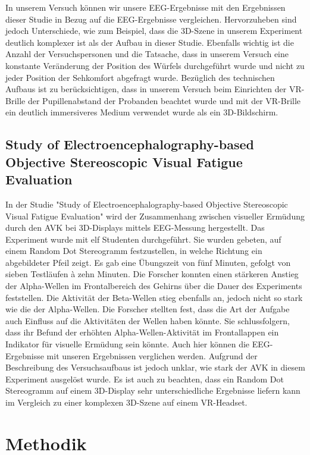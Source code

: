 \documentclass[conference]{IEEEtran}
\begin{document}
In unserem Versuch können wir unsere EEG-Ergebnisse mit den Ergebnissen dieser Studie in Bezug auf die EEG-Ergebnisse vergleichen. Hervorzuheben sind jedoch Unterschiede, wie zum Beispiel, dass die 3D-Szene in unserem Experiment deutlich komplexer ist als der Aufbau in dieser Studie. Ebenfalls wichtig ist die Anzahl der Versuchspersonen und die Tatsache, dass in unserem Versuch eine konstante Veränderung der Position des Würfels durchgeführt wurde und nicht zu jeder Position der Sehkomfort abgefragt wurde. Bezüglich des technischen Aufbaus ist zu berücksichtigen, dass in unserem Versuch beim Einrichten der VR-Brille der Pupillenabstand der Probanden beachtet wurde und mit der VR-Brille ein deutlich immersiveres Medium verwendet wurde als ein 3D-Bildschirm.


\subsection{Study of Electroencephalography-based Objective Stereoscopic Visual Fatigue Evaluation}
In der Studie "\textnormal{Study} of Electroencephalography-based Objective Stereoscopic Visual Fatigue Evaluation" \cite{b7} wird der Zusammenhang zwischen visueller Ermüdung durch den AVK bei 3D-Displays mittels EEG-Messung hergestellt.
Das Experiment wurde mit elf Studenten durchgeführt. Sie wurden gebeten, auf einem Random Dot Stereogramm festzustellen, in welche Richtung ein abgebildeter Pfeil zeigt. Es gab eine Übungszeit von fünf Minuten, gefolgt von sieben Testläufen à zehn Minuten.
Die Forscher konnten einen stärkeren Anstieg der Alpha-Wellen im Frontalbereich des Gehirns über die Dauer des Experiments feststellen. Die Aktivität der Beta-Wellen stieg ebenfalls an, jedoch nicht so stark wie die der Alpha-Wellen. Die Forscher stellten fest, dass die Art der Aufgabe auch Einfluss auf die Aktivitäten der Wellen haben könnte. Sie schlussfolgern, dass ihr Befund der erhöhten Alpha-Wellen-Aktivität im Frontallappen ein Indikator für visuelle Ermüdung sein könnte.
Auch hier können die EEG-Ergebnisse mit unseren Ergebnissen verglichen werden. Aufgrund der Beschreibung des Versuchsaufbaus ist jedoch unklar, wie stark der AVK in diesem Experiment ausgelöst wurde. Es ist auch zu beachten, dass ein Random Dot Stereogramm auf einem 3D-Display sehr unterschiedliche Ergebnisse liefern kann im Vergleich zu einer komplexen 3D-Szene auf einem VR-Headset.
 

\section{Methodik}
\end{document}
